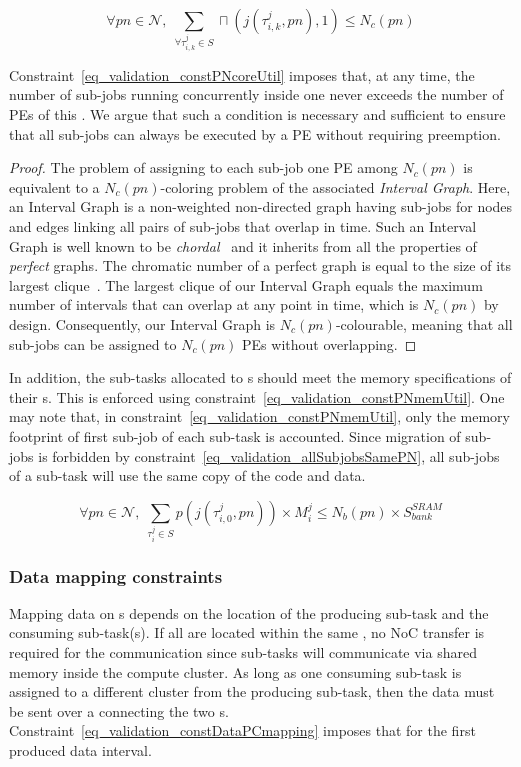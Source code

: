 \documentclass[main.tex]{subfiles}
\begin{document}
\begin{equation}
    \label{eq_validation_constPNcoreUtil}
    \forall pn \in \mathcal{N} , \;
    \underset{\forall \tau_{i,k}^j \in S}{\sum} \sqcap( j( \tau_{i,k}^j , pn ),1) \leq N_c(pn)
\end{equation}

Constraint~\ref{eq_validation_constPNcoreUtil} imposes that, at any time, the number of sub-jobs running concurrently inside one \PN{} never exceeds the number of PEs of this \PN{}. We argue that such a condition is necessary and sufficient to ensure that all sub-jobs can always be executed by a PE without requiring preemption. 

\begin{proof}
The problem of assigning to each sub-job one PE among $N_c(pn)$ is equivalent to a $N_c(pn)$-coloring problem of the associated \emph{Interval Graph}. Here, an Interval Graph is a non-weighted non-directed graph having sub-jobs for nodes and edges linking all pairs of sub-jobs that overlap in time. Such an Interval Graph is well known to be \emph{chordal}~\cite{Lekkeikerker1962} and it inherits from all the properties of \emph{perfect} graphs. The chromatic number of a perfect graph is equal to the size of its largest clique~\cite{Fanica1972}. The largest clique of our Interval Graph equals the maximum number of intervals that can overlap at any point in time, which is $N_c(pn)$ by design. Consequently, our Interval Graph is $N_c(pn)$-colourable, meaning that all sub-jobs can be assigned to $N_c(pn)$ PEs without overlapping.
\end{proof}



In addition, the sub-tasks allocated to \PN{}s should meet the memory specifications of their \PN{}s. This is enforced using constraint~\ref{eq_validation_constPNmemUtil}. One may note that, in constraint~\ref{eq_validation_constPNmemUtil}, only the memory footprint of first sub-job of each sub-task is accounted. Since migration of sub-jobs is forbidden by constraint~\ref{eq_validation_allSubjobsSamePN}, all sub-jobs of a sub-task will use the same copy of the code and data.

\begin{equation}
    \label{eq_validation_constPNmemUtil}
    \forall pn \in \mathcal{N} , \;
    \underset{ \tau_i^j \in S }{\sum} p( j( \tau_{i,0}^j , pn ) ) \times M_i^j \leq N_b(pn) \times S_{bank}^{SRAM}
\end{equation}

\subsubsection{Data mapping constraints}
Mapping data on \PC{}s depends on the location of the producing sub-task and the consuming sub-task(s). If all are located within the same \PN{}, no NoC transfer is required for the communication since sub-tasks will communicate via shared memory inside the compute cluster. As long as one consuming sub-task is assigned to a different cluster from the producing sub-task, then the data must be sent over a \PC{} connecting the two \PN{}s. Constraint~\ref{eq_validation_constDataPCmapping} imposes that for the first produced data interval.
\end{document}

